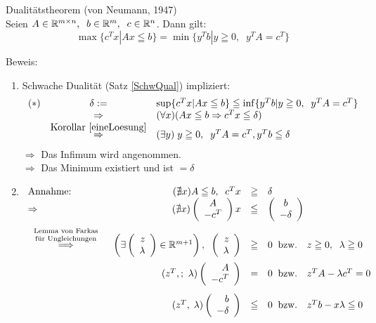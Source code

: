 \begin{satz}
Dualitätstheorem (von Neumann, 1947)\\
Seien $A \in \mathbb{R}^{m \times n}, \; \;  b \in \mathbb{R}^{m}, \;\; c \in \mathbb{R}^{n}$.
Dann gilt:
\[\max \{c^{T}x | A x \leqq b\}=\min \{y^{T}b| y \geqq 0 , \; \; y^{T}A = 
c^{T} \}\]
\end{satz}
Beweis:
\begin{enumerate}
\item Schwache Dualität (Satz \ref{SchwQual}) impliziert:
\[\begin{array}{ccl}
(\ast)& \delta :=& \sup \{c^{T}x | A x \leqq b\} \leqq \inf \{y^{T}b | y
\geqq 0, \; \; y^{T}A = c^{T} \}\\
& \Rightarrow& (\forall x) (A x \leqq b \Rightarrow c^{T}x \leqq \delta)\\
&\stackrel{\mbox{Korollar \ref{eineLoesung}}}{\Rightarrow}& (\exists y) \;
y\geqq 0, \; \; y^{T}A = c^{T},y ^{T}b \leqq \delta
\end{array}
\]
$\Rightarrow$ Das Infimum wird angenommen.\\
$\Rightarrow$ Das Minimum existiert und ist $=\delta$

\item $\begin{array}[t]{lrcl} \mbox {Annahme:}
&(\nexists x) A \leqq b, \; \; c^{T}x &\geqq& \delta\\
\Rightarrow& (\nexists x) \left(\begin{array}{c}A\\-c^{T}\end{array}\right)
x &\leqq&
\left(\begin{array}{c}b\\-\delta\end{array}\right)\vspace{2mm}\\
\stackrel{\mbox{\scriptsize \begin{tabular}{c}Lemma von Farkas\\ für
Ungleichungen\end{tabular}}}{\Longrightarrow}&\left(\exists \vect{z\\\lambda} \in
\RR^{m+1}\right),\;\; \vect{z\\\lambda} &\geqq& 0 \; \; \mbox{bzw. }\;\; z
\geqq 0, \; \; \lambda \geqq 0\vspace{2mm}\\
&(z^{T},;\ \lambda) \vect{A\\-c^{T}} &=& 0 \; \;  \mbox{bzw. } \;\; z^{T} A -
\lambda c^{T} = 0\vspace{3mm}\\
&(z^{T}, \; \lambda )  \vect{b\\-\delta} &\leqq& 0 \; \;  \mbox{bzw. }\;\;  z^{T}b
- x \lambda \leqq 0
\end{array}$


\end{enumerate}
